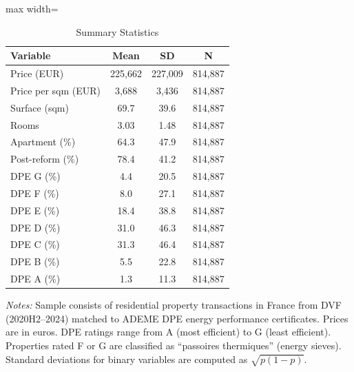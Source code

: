 \begin{table}[htbp]
\centering
\caption{Summary Statistics}
\label{tab:sumstats}
\begin{adjustbox}{max width=\textwidth}
\begin{tabular}{lccc}
\toprule
Variable & Mean & SD & N \\
\midrule
Price (EUR) & 225,662 & 227,009 & 814,887 \\
Price per sqm (EUR) & 3,688 & 3,436 & 814,887 \\
Surface (sqm) & 69.7 & 39.6 & 814,887 \\
Rooms & 3.03 & 1.48 & 814,887 \\
Apartment (\%) & 64.3 & 47.9 & 814,887 \\
Post-reform (\%) & 78.4 & 41.2 & 814,887 \\
DPE G (\%) & 4.4 & 20.5 & 814,887 \\
DPE F (\%) & 8.0 & 27.1 & 814,887 \\
DPE E (\%) & 18.4 & 38.8 & 814,887 \\
DPE D (\%) & 31.0 & 46.3 & 814,887 \\
DPE C (\%) & 31.3 & 46.4 & 814,887 \\
DPE B (\%) & 5.5 & 22.8 & 814,887 \\
DPE A (\%) & 1.3 & 11.3 & 814,887 \\
\bottomrule
\end{tabular}
\end{adjustbox}
\begin{tablenotes}
\small
\item \textit{Notes:} Sample consists of residential property transactions in France from DVF (2020H2--2024) matched to ADEME DPE energy performance certificates. Prices are in euros. DPE ratings range from A (most efficient) to G (least efficient). Properties rated F or G are classified as ``passoires thermiques'' (energy sieves). Standard deviations for binary variables are computed as $\sqrt{p(1-p)}$.
\end{tablenotes}
\end{table}
